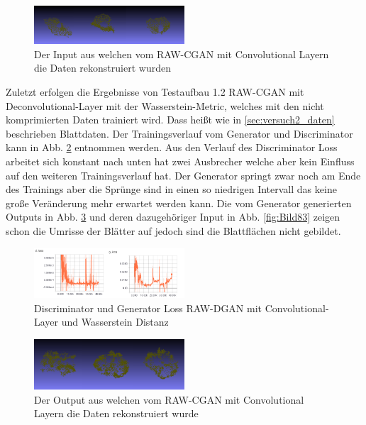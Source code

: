 \documentclass{llncs}
\begin{document}
\begin{figure}[htbp] 
	\centering
	\includegraphics[width=0.5\textwidth]{dc_pgan_ws_real.png}
	\caption{Der Input aus welchen vom RAW-CGAN mit Convolutional Layern die Daten rekonstruiert wurden}
	\label{fig:Bild78}
\end{figure}

Zuletzt erfolgen die Ergebnisse von Testaufbau 1.2 RAW-CGAN mit Deconvolutional-Layer mit der Wasserstein-Metric, welches mit den nicht komprimierten Daten trainiert wird. Dass heißt wie in \ref{sec:versuch2_daten} beschrieben Blattdaten. Der Trainingsverlauf vom Generator und Discriminator kann in Abb. \ref{fig:Bild1001} entnommen werden. Aus den Verlauf des Discriminator Loss arbeitet sich konstant nach unten hat zwei Ausbrecher welche aber kein Einfluss auf den weiteren Trainingsverlauf hat. Der Generator springt zwar noch am Ende des Trainings aber die Sprünge sind in einen so niedrigen Intervall das keine große Veränderung mehr erwartet werden kann. Die vom Generator generierten Outputs in Abb. \ref{fig:Bild82} und deren dazugehöriger Input in Abb. \ref{fig:Bild83} zeigen schon die Umrisse der Blätter auf jedoch sind die Blattflächen nicht gebildet. 

\begin{figure}[htbp] 
	\centering
	\includegraphics[width=0.5\textwidth]{cgan_ws_loss.png}
	\caption{Discriminator und Generator Loss RAW-DGAN mit Convolutional-Layer und Wasserstein Distanz}
	\label{fig:Bild1001}
\end{figure}

\begin{figure}[htbp] 
	\centering
	\includegraphics[width=0.5\textwidth]{raw_cgan_ws_fake.png}
	\caption{Der Output aus welchen vom RAW-CGAN mit Convolutional Layern die Daten rekonstruiert wurde}
	\label{fig:Bild82}
\end{figure}
\end{document}
